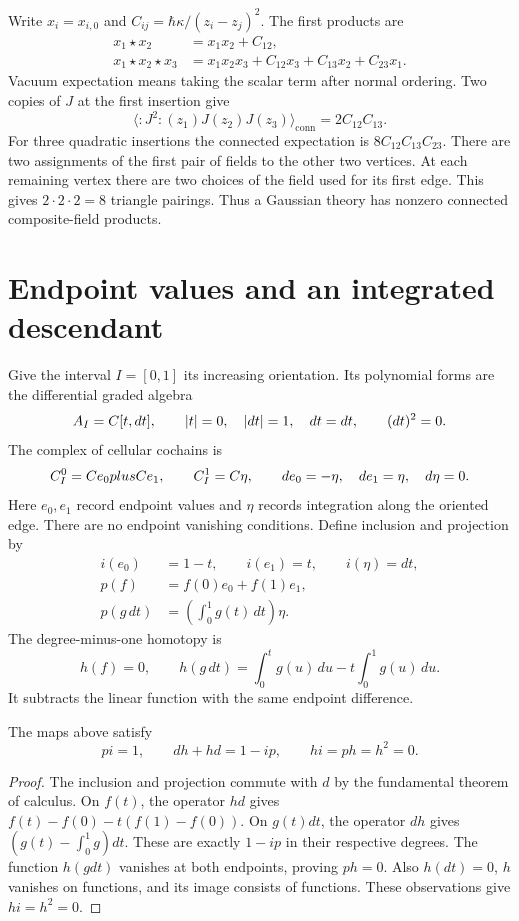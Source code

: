 Write $x_i=x_{i,0}$ and $C_{ij}=\hbar\kappa/(z_i-z_j)^2$.
The first products are
\begin{equation*}
 \begin{split}
 x_1\star x_2&=x_1x_2+C_{12},\\
 x_1\star x_2\star x_3
 &=x_1x_2x_3+C_{12}x_3+C_{13}x_2+C_{23}x_1.
 \end{split}
\end{equation*}
Vacuum expectation means taking the scalar term after normal ordering.
Two copies of $J$ at the first insertion give
\[
 \langle :J^2:(z_1)J(z_2)J(z_3)\rangle_{\mathrm{conn}}
   =2C_{12}C_{13}.
\]
For three quadratic insertions the connected expectation is
$8C_{12}C_{13}C_{23}$.  There are two assignments of the first pair
of fields to the other two vertices.  At each remaining vertex there
are two choices of the field used for its first edge.  This gives
$2\cdot2\cdot2=8$ triangle pairings.  Thus a Gaussian theory has
nonzero connected composite-field products.

\section{Endpoint values and an integrated descendant}

Give the interval $I=[0,1]$ its increasing orientation.  Its polynomial
forms are the differential graded algebra
\[
 A_I=C[t,dt],\qquad |t|=0,\quad |dt|=1,\quad d t=dt,
 \qquad (dt)^2=0.
\]
The complex of cellular cochains is
\[
 C_I^0=C e_0plusC e_1,\qquad C_I^1=C\eta,
 \qquad de_0=-\eta,\quad de_1=\eta,\quad d\eta=0.
\]
Here $e_0,e_1$ record endpoint values and $\eta$ records integration
along the oriented edge.  There are no endpoint vanishing conditions.
Define inclusion and projection by
\begin{equation*}
 \begin{aligned}
 i(e_0)&=1-t,\qquad i(e_1)=t,\qquad i(\eta)=dt,\\
 p(f)&=f(0)e_0+f(1)e_1,\\
 p(g\,dt)&=\left(\int_0^1g(t)\,dt\right)\eta.
 \end{aligned}
\end{equation*}
The degree-minus-one homotopy is
\begin{equation*}
 h(f)=0,\qquad
 h(g\,dt)=\int_0^t g(u)\,du-t\int_0^1g(u)\,du.
\end{equation*}
It subtracts the linear function with the same endpoint difference.

\begin{lemma}
\label{lem:interval-contraction}
The maps above satisfy
\[
 pi=1,\qquad dh+hd=1-ip,\qquad hi=ph=h^2=0.
\]
\end{lemma}
\begin{proof}
The inclusion and projection commute with $d$ by the fundamental theorem
of calculus.  On $f(t)$, the operator $hd$ gives
$f(t)-f(0)-t(f(1)-f(0))$.  On $g(t)dt$, the operator $dh$ gives
$(g(t)-\int_0^1g)dt$.  These are exactly $1-ip$ in their respective
degrees.  The function $h(gdt)$ vanishes at both endpoints, proving
$ph=0$.  Also $h(dt)=0$, $h$ vanishes on functions, and its image
consists of functions.  These observations give $hi=h^2=0$.
\end{proof}


